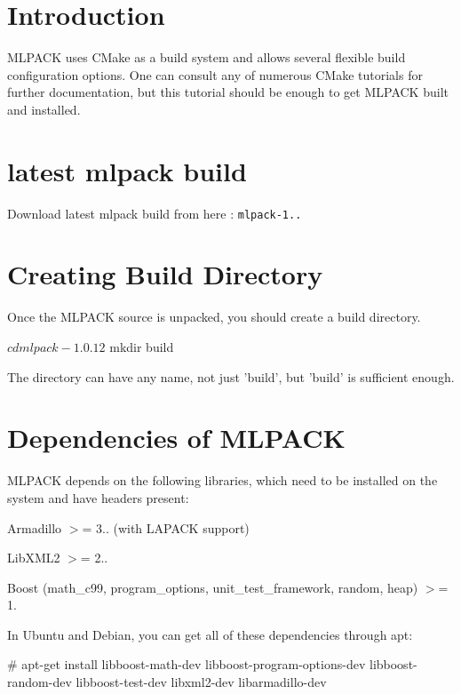 \section{Introduction}\label{build_buildintro}
M\-L\-P\-A\-C\-K uses C\-Make as a build system and allows several flexible build configuration options. One can consult any of numerous C\-Make tutorials for further documentation, but this tutorial should be enough to get M\-L\-P\-A\-C\-K built and installed.\section{latest mlpack build}\label{build_Download}
Download latest mlpack build from here \-: {\tt mlpack-\/1..}\section{Creating Build Directory}\label{build_builddir}
Once the M\-L\-P\-A\-C\-K source is unpacked, you should create a build directory.


\begin{DoxyCode}
$ cd mlpack-1.0.12
$ mkdir build
\end{DoxyCode}


The directory can have any name, not just 'build', but 'build' is sufficient enough.\section{Dependencies of M\-L\-P\-A\-C\-K}\label{build_dep}
M\-L\-P\-A\-C\-K depends on the following libraries, which need to be installed on the system and have headers present\-:


\begin{DoxyItemize}
\item Armadillo $>$= 3.. (with L\-A\-P\-A\-C\-K support)
\item Lib\-X\-M\-L2 $>$= 2..
\item Boost (math\-\_\-c99, program\-\_\-options, unit\-\_\-test\-\_\-framework, random, heap) $>$= 1.
\end{DoxyItemize}

In Ubuntu and Debian, you can get all of these dependencies through apt\-:


\begin{DoxyCode}
\textcolor{preprocessor}{# apt-get install libboost-math-dev libboost-program-options-dev}
\textcolor{preprocessor}{  libboost-random-dev libboost-test-dev libxml2-dev libarmadillo-dev}
\end{DoxyCode}


